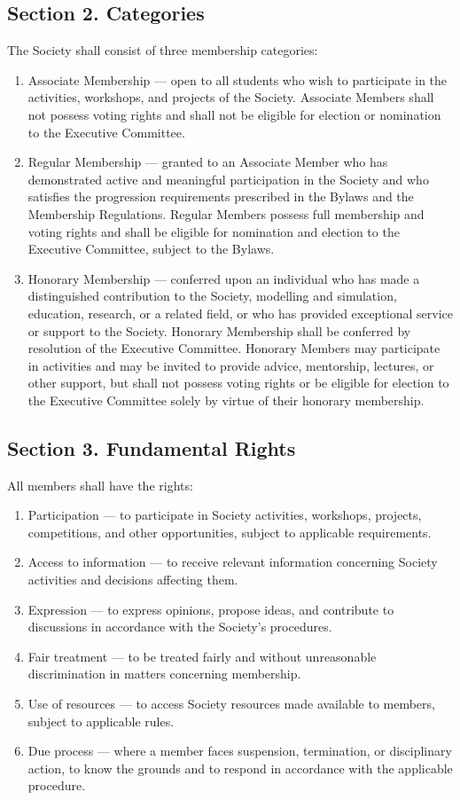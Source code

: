 \documentclass[11pt,a4paper]{article}
\begin{document}
\subsection*{Section 2. Categories}
The Society shall consist of three membership categories:
\begin{enumerate}
    \item Associate Membership --- open to all students who wish to participate in the activities, workshops, and projects of the Society. Associate Members shall not possess voting rights and shall not be eligible for election or nomination to the Executive Committee.
    \item Regular Membership --- granted to an Associate Member who has demonstrated active and meaningful participation in the Society and who satisfies the progression requirements prescribed in the Bylaws and the Membership Regulations. Regular Members possess full membership and voting rights and shall be eligible for nomination and election to the Executive Committee, subject to the Bylaws.
    \item Honorary Membership --- conferred upon an individual who has made a distinguished contribution to the Society, modelling and simulation, education, research, or a related field, or who has provided exceptional service or support to the Society. Honorary Membership shall be conferred by resolution of the Executive Committee. Honorary Members may participate in activities and may be invited to provide advice, mentorship, lectures, or other support, but shall not possess voting rights or be eligible for election to the Executive Committee solely by virtue of their honorary membership.
\end{enumerate}

\subsection*{Section 3. Fundamental Rights}
All members shall have the rights:
\begin{enumerate}[leftmargin=*]
    \item Participation --- to participate in Society activities, workshops, projects, competitions, and other opportunities, subject to applicable requirements.
    \item Access to information --- to receive relevant information concerning Society activities and decisions affecting them.
    \item Expression --- to express opinions, propose ideas, and contribute to discussions in accordance with the Society's procedures.
    \item Fair treatment --- to be treated fairly and without unreasonable discrimination in matters concerning membership.
    \item Use of resources --- to access Society resources made available to members, subject to applicable rules.
    \item Due process --- where a member faces suspension, termination, or disciplinary action, to know the grounds and to respond in accordance with the applicable procedure.
\end{enumerate}
\end{document}

